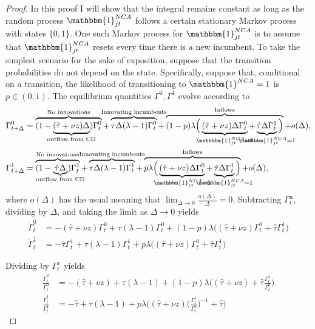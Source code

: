 \documentclass[11pt,english]{article}
\theoremstyle{definition}
\begin{document}
\begin{proof}
	In this proof I will show that the integral remains constant as long as the random process $\mathbbm{1}^{NCA}_{jt}$ follows a certain stationary Markov process with states $\{0,1\}$. One such Markov process for $\mathbbm{1}^{NCA}_{jt}$ is to assume that $\mathbbm{1}^{NCA}_{jt}$ resets every time there is a new incumbent. To take the simplest scenario for the sake of exposition, suppose that the transition probabilities do not depend on the state. Specifically, suppose that, conditional on a transition, the likelihood of transitioning to $\mathbbm{1}^{NCA} = 1$ is $p \in (0,1)$. The equilibrium quantities $\Gamma^0,\Gamma^1$ evolve according to
	\begin{align}
		\Gamma^0_{t+\Delta} &= \overbrace{(1 - \underbrace{(\hat{\tau} + \nu z) \Delta }_{\mathclap{\text{outflow from CD}}} )  \Gamma_t^0}^{\mathclap{\text{No innovations}}} + \overbrace{\tau \Delta (\lambda - 1) \Gamma_t^0}^{\mathclap{\text{Innovating incumbents}}} + \overbrace{(1-p) \lambda \Big( \underbrace{(\hat{\tau} + \nu z) \Delta \Gamma_t^0}_{\mathclap{\mathbbm{1}^{NCA}_{jt} = 0}} +  \underbrace{\hat{\tau} \Delta   \Gamma_t^1}_{\mathclap{\mathbbm{1}^{NCA}_{jt} = 1}} \Big)}^{\mathclap{\text{Inflows}}} + o(\Delta), \\
		 \Gamma^1_{t+\Delta} &= \overbrace{(1 - \underbrace{\hat{\tau} \Delta }_{\mathclap{\text{outflow from CD}}})   \Gamma_t^1}^{\mathclap{\text{No innovations}}}  + \overbrace{\tau \Delta (\lambda -1 ) \Gamma_t^1}^{\mathclap{\text{Innovating incumbents}}}  + \overbrace{p \lambda \Big( \underbrace{(\hat{\tau} + \nu z) \Delta \Gamma_t^0}_{\mathclap{\mathbbm{1}^{NCA}_{jt} = 0}} + \underbrace{\hat{\tau} \Delta \Gamma_t^1}_{\mathclap{\mathbbm{1}^{NCA}_{jt} = 1}} \Big)}^{\mathclap{\text{Inflows}}} + o(\Delta),
	\end{align}
	where $o(\Delta)$ has the usual meaning that $\lim_{\Delta \to 0} \frac{o(\Delta)}{\Delta} = 0$. Subtracting $\Gamma_t^{\mathbf{x}}$, dividing by $\Delta$, and taking the limit as $\Delta \to 0$  yields
	\begin{align}
		\dot{\Gamma}_t^0 &= -(\hat{\tau} + \nu z) \Gamma_t^0 + \tau (\lambda - 1) \Gamma_t^0 + (1-p)\lambda \Big( (\hat{\tau} + \nu z) \Gamma_t^0 + \hat{\tau} \Gamma_t^1 \Big) \\
		\dot{\Gamma}_t^1 &= -\hat{\tau} \Gamma_t^1 + \tau (\lambda - 1) \Gamma_t^1 + p\lambda \Big( (\hat{\tau} + \nu z) \Gamma_t^0 + \hat{\tau} \Gamma_t^1 \Big)
	\end{align}
	
	Dividing by $\Gamma_t^x$ yields
	\begin{align}
		\frac{\dot{\Gamma}_t^0}{\Gamma_t^0} &= -( \hat{\tau} + \nu z) + \tau (\lambda - 1) + (1-p)\lambda \Big( (\hat{\tau} + \nu z) + \hat{\tau} \frac{\Gamma_t^1 }{ \Gamma_t^0}\Big) \\
		\frac{\dot{\Gamma}_t^1}{\Gamma_t^1} &= -\hat{\tau}  + \tau (\lambda - 1) + p\lambda \Big( (\hat{\tau} + \nu z) \big(\frac{\Gamma_t^1}{\Gamma_t^0}\big)^{-1} + \hat{\tau}  \Big)
	\end{align}
	

\end{proof}
\end{document}
